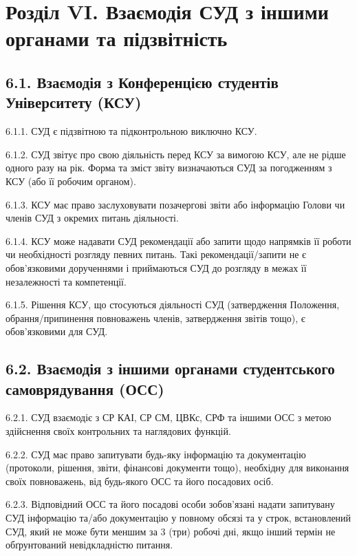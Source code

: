 \section*{Розділ VI. Взаємодія СУД з іншими органами та підзвітність}

\subsection*{6.1. Взаємодія з Конференцією студентів Університету (КСУ)}
    6.1.1. СУД є підзвітною та підконтрольною виключно КСУ.

    6.1.2. СУД звітує про свою діяльність перед КСУ за вимогою КСУ, але не рідше одного разу на рік. Форма та зміст звіту визначаються СУД за погодженням з КСУ (або її робочим органом).

    6.1.3. КСУ має право заслуховувати позачергові звіти або інформацію Голови чи членів СУД з окремих питань діяльності.

    6.1.4. КСУ може надавати СУД рекомендації або запити щодо напрямків її роботи чи необхідності розгляду певних питань. Такі рекомендації/запити не є обов'язковими дорученнями і приймаються СУД до розгляду в межах її незалежності та компетенції.

    6.1.5. Рішення КСУ, що стосуються діяльності СУД (затвердження Положення, обрання/припинення повноважень членів, затвердження звітів тощо), є обов'язковими для СУД.

\subsection*{6.2. Взаємодія з іншими органами студентського самоврядування (ОСС)}
    6.2.1. СУД взаємодіє з СР КАІ, СР СМ, ЦВКс, СРФ та іншими ОСС з метою здійснення своїх контрольних та наглядових функцій.

    6.2.2. СУД має право запитувати будь-яку інформацію та документацію (протоколи, рішення, звіти, фінансові документи тощо), необхідну для виконання своїх повноважень, від будь-якого ОСС та його посадових осіб.

    6.2.3. Відповідний ОСС та його посадові особи зобов'язані надати запитувану СУД інформацію та/або документацію у повному обсязі та у строк, встановлений СУД, який не може бути меншим за 3 (три) робочі дні, якщо інший термін не обґрунтований невідкладністю питання.

